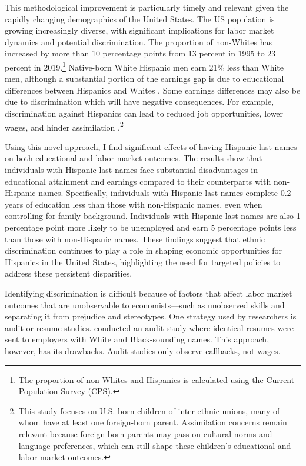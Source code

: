 This methodological improvement is particularly timely and relevant given the rapidly changing demographics of the United States. The US population is growing increasingly diverse, with significant implications for labor market dynamics and potential discrimination. The proportion of non-Whites has increased by more than 10 percentage points from 13 percent in 1995 to 23 percent in 2019.\footnote{The proportion of non-Whites and Hispanics is calculated using the Current Population Survey (CPS).} Native-born White Hispanic men earn 21\% less than White men, although a substantial portion of the earnings gap is due to educational differences between Hispanics and Whites \autocite{duncan2006hispanics, duncan2018identifying, duncan2018socioeconomic}. Some earnings differences may also be due to discrimination which will have negative consequences. For example, discrimination against Hispanics can lead to reduced job opportunities, lower wages, and hinder assimilation \autocite{chettyWhereLandOpportunity2014,bowles2002inheritance, djajic2003assimilation}.\footnote{This study focuses on U.S.-born children of inter-ethnic unions, many of whom have at least one foreign-born parent. Assimilation concerns remain relevant because foreign-born parents may pass on cultural norms and language preferences, which can still shape these children's educational and labor market outcomes.}

Using this novel approach, I find significant effects of having Hispanic last names on both educational and labor market outcomes. The results show that individuals with Hispanic last names face substantial disadvantages in educational attainment and earnings compared to their counterparts with non-Hispanic names. Specifically, individuals with Hispanic last names complete 0.2 years of education less than those with non-Hispanic names, even when controlling for family background. Individuals with Hispanic last names are also 1 percentage point more likely to be unemployed  and earn 5 percentage points less than those with non-Hispanic names. These findings suggest that ethnic discrimination continues to play a role in shaping economic opportunities for Hispanics in the United States, highlighting the need for targeted policies to address these persistent disparities.

Identifying discrimination is difficult because of factors that affect labor market outcomes that are unobservable to economists---such as unobserved skills and separating it from prejudice and stereotypes. One strategy used by researchers is audit or resume studies. \textcite{bertrand2004emily} conducted an audit study where identical resumes were sent to employers with White and Black-sounding names. This approach, however, has its drawbacks. Audit studies only observe callbacks, not wages. 

